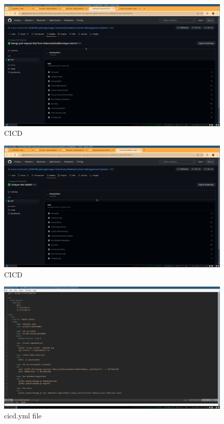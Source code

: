 \documentclass[a4paper,12pt]{article}
\begin{document}
\begin{figure}[H]
    \centering
    \includegraphics[width=1\textwidth]{images/meet48.png}
    \caption{CICD}
    \label{fig:meet48}
\end{figure}

\begin{figure}[H]
    \centering
    \includegraphics[width=1\textwidth]{images/meet49.png}
    \caption{CICD}
    \label{fig:meet49}
\end{figure}

\begin{figure}[H]
    \centering
    \includegraphics[width=1\textwidth]{images/meet410.png}
    \caption{cicd.yml file}
    \label{fig:meet410}
\end{figure}
\newpage
\end{document}
